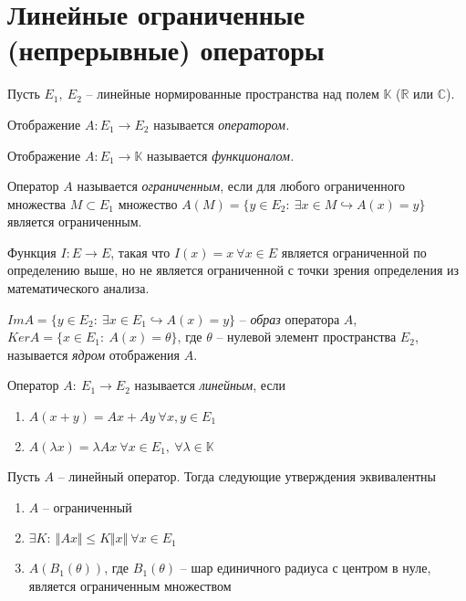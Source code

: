 \section{Линейные ограниченные (непрерывные) операторы}

Пусть $\displaystyle E_{1} ,\ E_{2}$ -- линейные нормированные пространства над полем $\displaystyle \mathbb{K}$ ($\displaystyle \mathbb{R}$ или $\displaystyle \mathbb{C}$).
\begin{definition}
Отображение $\displaystyle A:E_{1}\rightarrow E_{2}$ называется \textit{оператором}\textit{.}
\end{definition}
\begin{definition}
Отображение $\displaystyle A:E_{1}\rightarrow \mathbb{K}$ называется \textit{функционалом}\textit{.}
\end{definition}
\begin{definition}
Оператор $\displaystyle A$ называется \textit{ограниченным}, если для любого ограниченного множества $\displaystyle M\subset E_{1}$ множество $\displaystyle A( M) =\{y\in E_{2} :\ \exists x\in M\hookrightarrow A( x) =y\}$ является ограниченным.
\end{definition}
\begin{note}
Функция $\displaystyle I:E\rightarrow E$, такая что $\displaystyle I( x) =x\ \forall x\in E$ является ограниченной по определению выше, но не является ограниченной с точки зрения определения из математического анализа.
\end{note}
\begin{definition}
$\displaystyle ImA=\{y\in E_{2} :\ \exists x\in E_{1} \hookrightarrow A( x) =y\}$ -- \textit{образ} оператора $\displaystyle A$, $\displaystyle KerA=\{x\in E_{1} :\ A( x) =\theta \}$, где $\displaystyle \theta $ -- нулевой элемент пространства $\displaystyle E_{2}$, называется \textit{ядром} отображения $\displaystyle A$.
\end{definition}
\begin{definition}
Оператор $\displaystyle A:\ E_{1}\rightarrow E_{2}$ называется \textit{линейным}, если
\begin{enumerate}
    \item $\displaystyle A( x+y) =Ax+Ay\ \forall x,y\in E_{1}$
    \item $\displaystyle A( \lambda x) =\lambda Ax\ \forall x\in E_{1} ,\ \forall \lambda \in \mathbb{K}$
\end{enumerate}
\end{definition}
\begin{proposition}
Пусть $\displaystyle A$ -- линейный оператор. Тогда следующие утверждения эквивалентны
\begin{enumerate}
    \item $\displaystyle A$ -- ограниченный
    \item $\displaystyle \exists K:\ \Vert Ax\Vert \leqslant K\Vert x\Vert \ \forall x\in E_{1}$
    \item $\displaystyle A( B_{1}( \theta ))$, где $\displaystyle B_{1}( \theta )$ -- шар единичного радиуса с центром в нуле, является ограниченным множеством
\end{enumerate}
\end{proposition}
